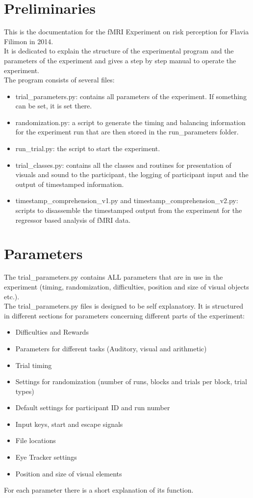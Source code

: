 \section{Preliminaries}
This is the documentation for the fMRI Experiment on risk perception for Flavia Filimon in 2014. \\ 
It is dedicated to explain the structure of the experimental program and the parameters of the experiment and gives a step by step manual to operate the experiment. \\
The program consists of several files:
\begin{itemize}
    \item trial\_parameters.py: contains all parameters of the experiment. If something can be set, it is set there.
    \item randomization.py: a script to generate the timing and balancing information for the experiment run that are then stored in the run\_parameters folder.
    \item run\_trial.py: the script to start the experiment. 
    \item trial\_classes.py: contains all the classes and routines for presentation of visuals and sound to the participant, the logging of participant input and the output of timestamped information.
    \item timestamp\_comprehension\_v1.py and timestamp\_comprehension\_v2.py: scripts to disassemble the timestamped output from the experiment for the regressor based analysis of fMRI data.
\end{itemize}

\section{Parameters}
The trial\_parameters.py contains ALL parameters that are in use in the experiment (timing, randomization, difficulties, position and size of visual objects etc.). \\
The trial\_parameters.py files is designed to be self explanatory. It is structured in different sections for parameters concerning different parts of the experiment:
\begin{itemize}
    \item Difficulties and Rewards
    \item Parameters for different tasks (Auditory, visual and arithmetic)
    \item Trial timing
    \item Settings for randomization (number of runs, blocks and trials per block, trial types)
    \item Default settings for participant ID and run number
    \item Input keys, start and escape signals
    \item File locations
    \item Eye Tracker settings
    \item Position and size of visual elements
\end{itemize}
For each parameter there is a short explanation of its function.


